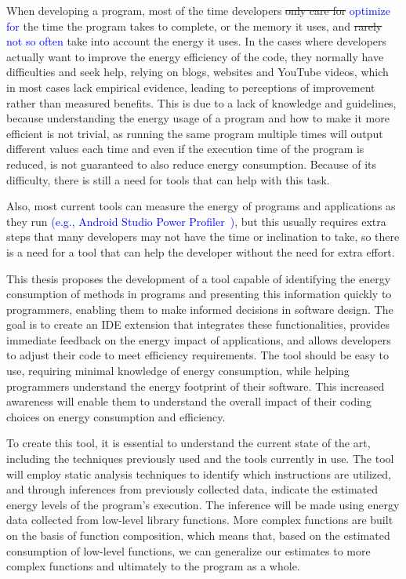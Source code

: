 \documentclass[sigplan]{acmart}
\newcommand{\wnote}[1]{\textcolor{blue}{#1}}
\begin{document}
When developing a program, most of the time developers \st{only care for} \wnote{optimize for} the time the program takes to complete, or the memory it uses, and \st{rarely} \wnote{not so often} take into account the energy it uses. 
In the cases where developers actually want to improve the energy efficiency of the code, they normally have difficulties and seek help, relying on blogs, websites and YouTube videos, which in most cases lack empirical evidence, leading to perceptions of improvement rather than measured benefits\cite{10.1145/3154384}. This is due to a lack of knowledge and guidelines, because understanding the energy usage of a program and how to make it more efficient is not trivial, as running the same program multiple times will output different values each time and even if the execution time of the program is reduced, is not guaranteed to also reduce energy consumption. Because of its difficulty, there is still a need for tools that can help with this task\cite{10.1145/2597073.2597110}. 

Also, most current tools can measure the energy of programs and applications as they run \wnote{(e.g., Android Studio Power Profiler~\cite{android_power_profiler})}, but this usually requires extra steps that many developers may not have the time or inclination to take, so there is a need for a tool that can help the developer without the need for extra effort\cite{10.1145/3154384}.

This thesis proposes the development of a tool capable of identifying the energy consumption of methods in programs and presenting this information quickly to programmers, enabling them to make informed decisions in software design. The goal is to create an IDE extension that integrates these functionalities, provides immediate feedback on the energy impact of applications, and allows developers to adjust their code to meet efficiency requirements. The tool should be easy to use, requiring minimal knowledge of energy consumption, while helping programmers understand the energy footprint of their software. This increased awareness will enable them to understand the overall impact of their coding choices on energy consumption and efficiency.

To create this tool, it is essential to understand the current state of the art, including the techniques previously used and the tools currently in use. The tool will employ static analysis techniques to identify which instructions are utilized, and through inferences from previously collected data, indicate the estimated energy levels of the program's execution. The inference will be made using energy data collected from low-level library functions. More complex functions are built on the basis of function composition, which means that, based on the estimated consumption of low-level functions, we can generalize our estimates to more complex functions and ultimately to the program as a whole. 
\end{document}
